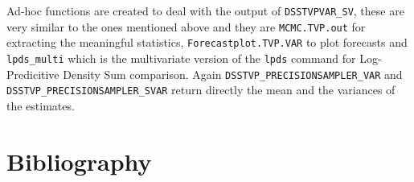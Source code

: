 \documentclass[
  12pt,
]{book}
\theoremstyle{break}
\theoremstyle{nonumberplain}
\begin{document}
Ad-hoc functions are created to deal with the output of
\texttt{DSSTVPVAR\_SV}, these are very similar to the ones mentioned
above and they are \texttt{MCMC.TVP.out} for extracting the meaningful
statistics, \texttt{Forecastplot.TVP.VAR} to plot forecasts and
\texttt{lpds\_multi} which is the multivariate version of the
\texttt{lpds} command for Log-Predicitive Density Sum comparison. Again
\texttt{DSSTVP\_PRECISIONSAMPLER\_VAR} and
\texttt{DSSTVP\_PRECISIONSAMPLER\_SVAR} return directly the mean and the
variances of the estimates.

\backmatter

\chapter{Bibliography}

\hypertarget{refs}{}
\end{document}
